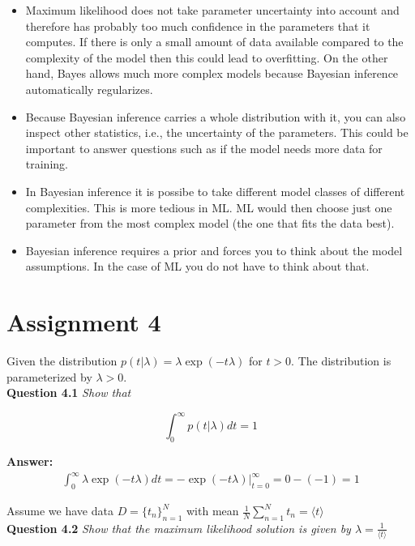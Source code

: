 \documentclass[a4paper]{article}
\begin{document}
\begin{itemize}
	\item Maximum likelihood does not take parameter uncertainty into account and therefore has probably too much confidence in the parameters that it computes. If there is only a small amount of data available compared to the complexity of the model then this could lead to overfitting. On the other hand, Bayes allows much more complex models because Bayesian inference automatically regularizes.
	\item Because Bayesian inference carries a whole distribution with it, you can also inspect other statistics, i.e., the uncertainty of the parameters. This could be important to answer questions such as if the model needs more data for training.
	\item In Bayesian inference it is possibe to take different model classes of different complexities. This is more tedious in ML. ML would then choose just one parameter from the most complex model (the one that fits the data best).
	\item Bayesian inference requires a prior and forces you to think about the model assumptions. In the case of ML you do not have to think about that.
\end{itemize}

\section*{Assignment 4}

Given the distribution $p(t | \lambda) = \lambda \exp(-t \lambda)$ for $t > 0$. The distribution is parameterized by $\lambda > 0$.\\

\textbf{Question 4.1}  \textit{Show that}

\begin{equation}
	\int_0^\infty p(t | \lambda) dt = 1
\end{equation}

\textbf{Answer:}\\

\begin{align*}
\int_0^\infty \lambda \exp(-t \lambda) dt = - \exp(-t \lambda) \Big|_{t=0}^\infty = 0 - (-1) = 1
\end{align*}

Assume we have data $D = \{ t_n \}_{n=1}^N$ with mean $\frac{1}{N} \sum_{n=1}^N t_n = \langle t \rangle $\\

\textbf{Question 4.2}  \textit{Show that the maximum likelihood solution is given by $\lambda = \frac{1}{ \langle t \rangle}$}\\
\end{document}
